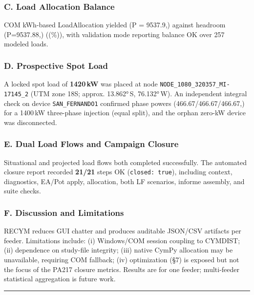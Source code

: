 \documentclass[
  11pt,
]{article}
\begin{document}
\subsubsection{C. Load Allocation
Balance}\label{c.-load-allocation-balance}

COM kWh-based LoadAllocation yielded (\sum P = 9537.9,)
against headroom (P=9537.88,) ((\Delta{}\%)), with
validation mode reporting balance OK over 257 modeled loads.

\subsubsection{D. Prospective Spot Load}\label{d.-prospective-spot-load}

A locked spot load of \textbf{1420\,kW} was placed at node
\texttt{NODE\_1080\_320357\_MI-17145\_2} (UTM zone 18S; approx.
13.862°\,S, 76.132°\,W). An independent integral check on device
\texttt{SAN\_FERNANDO1} confirmed phase powers
(466.67/466.67/466.67,) for a 1400\,kW three-phase injection
(equal split), and the orphan zero-kW device was disconnected.

\subsubsection{E. Dual Load Flows and Campaign
Closure}\label{e.-dual-load-flows-and-campaign-closure}

Situational and projected load flows both completed successfully. The
automated closure report recorded \textbf{21/21} steps OK
(\texttt{closed:\ true}), including context, diagnostics, EA/Pot apply,
allocation, both LF scenarios, informe assembly, and suite checks.

\subsubsection{F. Discussion and
Limitations}\label{f.-discussion-and-limitations}

RECYM reduces GUI chatter and produces auditable JSON/CSV artifacts per
feeder. Limitations include: (i) Windows/COM session coupling to
CYMDIST; (ii) dependence on study-file integrity; (iii) native CymPy
allocation may be unavailable, requiring COM fallback; (iv) optimization
(§7) is exposed but not the focus of the PA217 closure metrics. Results
are for one feeder; multi-feeder statistical aggregation is future work.

\begin{center}\rule{0.5\linewidth}{0.5pt}\end{center}
\end{document}
